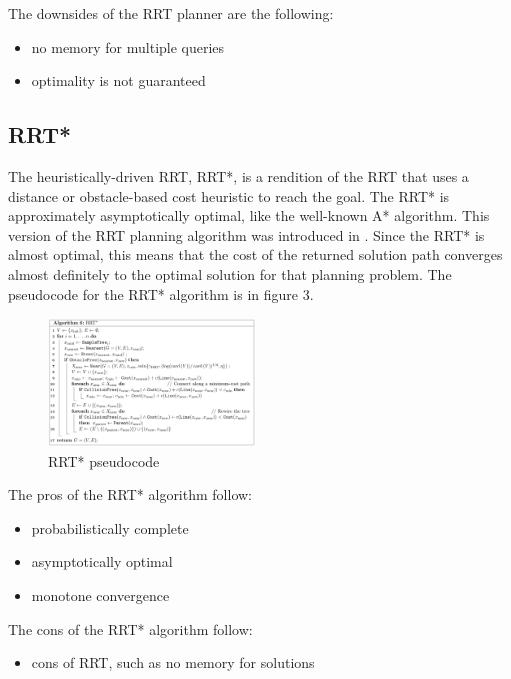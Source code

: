 \documentclass[conference]{IEEEtran} \usepackage[T1]{fontenc} \usepackage[backend=biber, style=ieee]{biblatex}
\begin{document}
The downsides of the RRT planner are the following:
\begin{itemize}
\item no memory for multiple queries
\item optimality is not guaranteed
\end{itemize}

\subsection{RRT*} \label{RRT*}
The heuristically-driven RRT, RRT*, is a rendition of the RRT that uses a distance or obstacle-based cost heuristic to reach the goal. The RRT* is approximately 
asymptotically optimal, like the well-known A* algorithm. This version of the RRT planning algorithm was introduced in \cite{sampling_star}. Since the RRT* is almost
optimal, this means that the cost of the returned solution path converges almost definitely to the optimal solution for that planning problem. The pseudocode for the
RRT* algorithm is in figure 3.

\begin{figure}
\label{figure3} 
\centering 
\includegraphics[width=0.49\textwidth]{rrt_star}
\caption{RRT* pseudocode}
\end{figure}

The pros of the RRT* algorithm follow:
\begin{itemize}
\item probabilistically complete
\item asymptotically optimal
\item monotone convergence
\end{itemize}

The cons of the RRT* algorithm follow:
\begin{itemize}
\item cons of RRT, such as no memory for solutions
\end{itemize}
\end{document}
